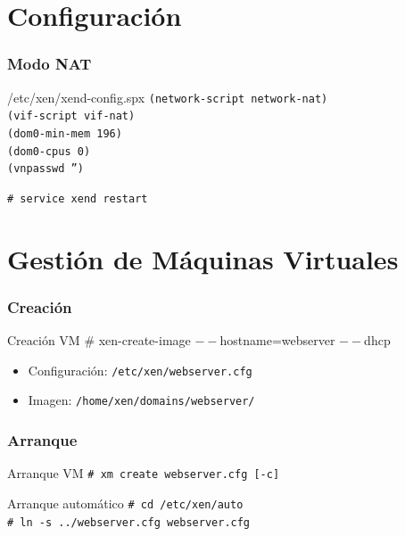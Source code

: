 \documentclass{beamer}
\begin{document}
\section{Configuración}

\begin{frame}[fragile]
  \frametitle{Modo NAT}
  \begin{block}{/etc/xen/xend-config.spx}
    \texttt{(network-script network-nat)} \\
    \texttt{(vif-script vif-nat)} \\
    \medskip
    \texttt{(dom0-min-mem 196) } \\
    \medskip
    \texttt{(dom0-cpus 0)} \\
    \medskip
    \texttt{(vnpasswd '')}
  \end{block}
  \bigskip
  \begin{center}
    \texttt{\# service xend restart}
  \end{center}
\end{frame}

\section{Gestión de Máquinas Virtuales}

\begin{frame}
  \frametitle{Creación}
  \begin{block}{Creación VM}
    \# xen-create-image $--$hostname=webserver $--$dhcp 
  \end{block}
  \begin{itemize}
    \item Configuración: \texttt{/etc/xen/webserver.cfg}
    \item Imagen: \texttt{/home/xen/domains/webserver/}
  \end{itemize}
\end{frame}

\begin{frame}[fragile]
  \frametitle{Arranque}
  \begin{block}{Arranque VM}
    \texttt{\# xm create webserver.cfg [-c]} \\
  \end{block}
  \bigskip
  \begin{block}{Arranque automático}
    \texttt{\# cd /etc/xen/auto} \\
    \texttt{\# ln -s ../webserver.cfg webserver.cfg} \\
  \end{block}
\end{frame}
\end{document}

